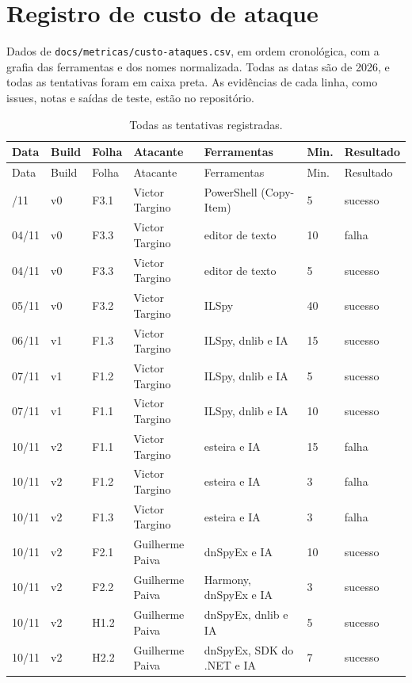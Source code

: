 \section{Registro de custo de ataque}
\label{ap:custos}

Dados de \texttt{docs/metricas/custo-ataques.csv}, em ordem cronológica, com a grafia das ferramentas e dos nomes normalizada. Todas as datas são de 2026, e todas as tentativas foram em caixa preta. As evidências de cada linha, como issues, notas e saídas de teste, estão no repositório.

{\small
\setlength{\tabcolsep}{4pt}
\begin{longtable}{L{1.2cm}L{1.0cm}L{1.0cm}L{2.6cm}L{5.4cm}L{1.0cm}L{1.6cm}}
\caption{Todas as tentativas registradas.}\label{qd:csv}\\
\toprule
Data & Build & Folha & Atacante & Ferramentas & Min. & Resultado \\
\midrule
\endfirsthead
\toprule
Data & Build & Folha & Atacante & Ferramentas & Min. & Resultado \\
\midrule
\endhead
\bottomrule
{}/11 & v0 & F3.1 & Victor Targino & PowerShell (Copy-Item) & 5 & sucesso \\
04/11 & v0 & F3.3 & Victor Targino & editor de texto & 10 & falha \\
04/11 & v0 & F3.3 & Victor Targino & editor de texto & 5 & sucesso \\
05/11 & v0 & F3.2 & Victor Targino & ILSpy & 40 & sucesso \\
06/11 & v1 & F1.3 & Victor Targino & ILSpy, dnlib e IA & 15 & sucesso \\
07/11 & v1 & F1.2 & Victor Targino & ILSpy, dnlib e IA & 5 & sucesso \\
07/11 & v1 & F1.1 & Victor Targino & ILSpy, dnlib e IA & 10 & sucesso \\
10/11 & v2 & F1.1 & Victor Targino & esteira e IA & 15 & falha \\
10/11 & v2 & F1.2 & Victor Targino & esteira e IA & 3 & falha \\
10/11 & v2 & F1.3 & Victor Targino & esteira e IA & 3 & falha \\
10/11 & v2 & F2.1 & Guilherme Paiva & dnSpyEx e IA & 10 & sucesso \\
10/11 & v2 & F2.2 & Guilherme Paiva & Harmony, dnSpyEx e IA & 3 & sucesso \\
10/11 & v2 & H1.2 & Guilherme Paiva & dnSpyEx, dnlib e IA & 5 & sucesso \\
10/11 & v2 & H2.2 & Guilherme Paiva & dnSpyEx, SDK do .NET e IA & 7 & sucesso \\

\end{longtable}}

